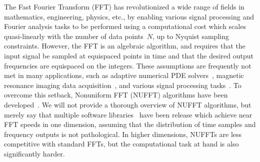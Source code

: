 
The Fast Fourier Transform (FFT) has revolutionized a wide range of fields in
mathematics, engineering, physics, etc., by enabling various signal processing
and Fourier analysis tasks to be performed using a computational cost which
scales quasi-linearly with the number of data points~$N$, up to Nyquist sampling
constraints. However, the FFT is an algebraic algorithm, and requires that the
input signal be sampled at equispaced points in time and that the desired output
frequencies are equispaced on the integers. These assumptions are frequently not
met in many applications, such as adaptive numerical PDE solvers~\cite{},
magnetic resonance imaging data acquisition~\cite{}, and various signal
processing tasks~\cite{}. To overcome this setback, Nonuniform FFT (NUFFT)
algorithms have been developed~\cite{}. We will not provide a thorough overview
of NUFFT algorithms, but merely say that multiple software libraries~\cite{}
have been release which achieve near FFT speeds in one dimension, assuming that
the distribution of time samples and frequency outputs is not pathological. In
higher dimensions, NUFFTs are less competitive with standard FFTs, but the
computational task at hand is also significantly harder.

